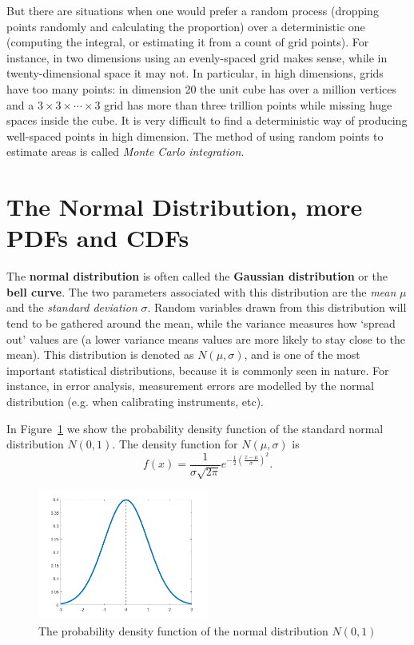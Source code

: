 But there are situations when one would prefer a random process (dropping points randomly and calculating the proportion) over a deterministic one (computing the integral, or estimating it from a count of grid points).
For instance, in two dimensions using an evenly-spaced grid makes sense, while in twenty-dimensional space it may not.
In particular, in high dimensions, grids have too many points: in dimension 20 the unit cube has over a million vertices and a $3 \times 3 \times \cdots \times 3$ grid has more than three trillion points while missing huge spaces inside the cube.
It is very difficult to find a deterministic way of producing well-spaced points in high dimension.
The method of using random points to estimate areas is called \emph{Monte Carlo integration}.


\section{The Normal Distribution, more PDFs and CDFs}\label{sec2:normal}

The \textbf{normal distribution} is often called the \textbf{Gaussian distribution} or the \textbf{bell curve}.
The two parameters associated with this distribution are the \emph{mean} $\mu$ and the \emph{standard deviation} $\sigma$.
Random variables drawn from this distribution will tend to be gathered around the mean, while the variance measures how `spread out' values are (a lower variance means values are more likely to stay close to the mean).
This distribution is denoted as $N(\mu, \sigma)$, and is one of the most important statistical distributions, because it is commonly seen in nature. For instance, in error analysis, measurement errors are modelled by the normal distribution (e.g. when calibrating instruments, etc).

In Figure~\ref{fig:2_normal} we show the probability density function of the standard normal distribution $N(0,1)$.
The density function for $N(\mu,\sigma)$ is 
$$f(x) = \frac{1}{\sigma\sqrt{2\pi}}e^{-\frac{1}{2}\left(\frac{x-\mu}{\sigma}\right)^2}.$$

\begin{figure}[htbp]
	\centering
	\includegraphics[width=0.5\textwidth]{fig/2_normal.png}
	\caption{The probability density function of the normal distribution $N(0,1)$ \label{fig:2_normal}}
\end{figure}

